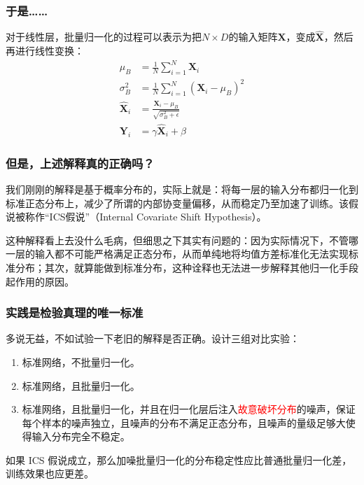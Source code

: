 \documentclass{ctexbeamer}
\begin{document}
\begin{frame}
    \frametitle{于是……}
    
    对于线性层，批量归一化的过程可以表示为把$N \times D$的输入矩阵$\mathbf{X}$，变成$\hat{\mathbf{X}}$，然后再进行线性变换：
\begin{align}
\mu_B &= \frac{1}{N} \sum_{i=1}^{N} \mathbf{X}_i \\
\sigma_B^2 &= \frac{1}{N} \sum_{i=1}^{N} (\mathbf{X}_i - \mu_B)^2 \\
\hat{\mathbf{X}}_i &= \frac{\mathbf{X}_i - \mu_B}{\sqrt{\sigma_B^2 + \epsilon}} \\
\mathbf{Y}_i &= \gamma \hat{\mathbf{X}}_i + \beta
\end{align}

\end{frame}

\begin{frame}
    \frametitle{但是，上述解释真的正确吗？}
    
    我们刚刚的解释是基于概率分布的，实际上就是：将每一层的输入分布都归一化到标准正态分布上，减少了所谓的内部协变量偏移，从而稳定乃至加速了训练\cite{ioffe2015batchnormalizationacceleratingdeep}。该假说被称作“ICS假说”（Internal Covariate Shift Hypothesis）。
    
    这种解释看上去没什么毛病，但细思之下其实有问题的：因为实际情况下，不管哪一层的输入都不可能严格满足正态分布，从而单纯地将均值方差标准化无法实现标准分布；其次，就算能做到标准分布，这种诠释也无法进一步解释其他归一化手段起作用的原因。\cite{kexuefm-6992}

\end{frame}

\begin{frame}
    \frametitle{实践是检验真理的唯一标准}

    多说无益，不如试验一下老旧的解释是否正确。设计三组对比实验\cite{santurkar2019doesbatchnormalizationhelp}：
    \begin{enumerate}
        \item 标准网络，不批量归一化。
        \item 标准网络，且批量归一化。
        \item 标准网络，且批量归一化，并且在归一化层后注入\textcolor{red}{故意破坏分布}的噪声，保证每个样本的噪声独立，且噪声的分布不满足正态分布，且噪声的量级足够大使得输入分布完全不稳定。
    \end{enumerate}

    如果 ICS 假说成立，那么加噪批量归一化的分布稳定性应比普通批量归一化差，训练效果也应更差。

\end{frame}
\end{document}
